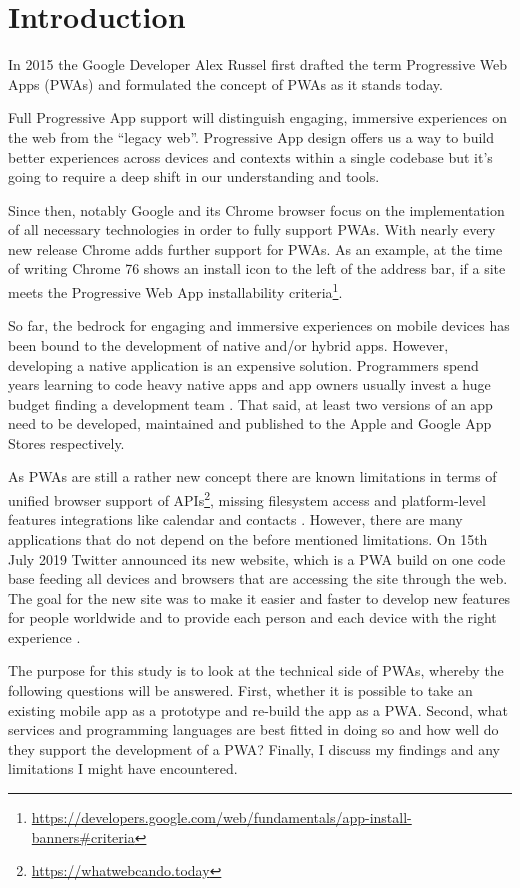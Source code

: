 \chapter{Introduction}

In 2015 the Google Developer Alex Russel first drafted the term Progressive Web Apps (PWAs) and formulated the concept of PWAs as it stands today.

Full Progressive App support will distinguish engaging, immersive experiences on the web from the “legacy web”. Progressive App design offers us a way to build better experiences across devices and contexts within a single codebase but it’s going to require a deep shift in our understanding and tools. \citep{russellProgressiveWebApps2015}

Since then, notably Google and its Chrome browser focus on the implementation of all necessary technologies in order to fully support PWAs. With nearly every new release Chrome adds further support for PWAs. As an example, at the time of writing Chrome 76 shows an install icon to the left of the address bar, if a site meets the Progressive Web App installability criteria\footnote{\url{https://developers.google.com/web/fundamentals/app-install-banners\#criteria}}.

So far, the bedrock for engaging and immersive experiences on mobile devices has been bound to the development of native and/or hybrid apps. However, developing a native application is an expensive solution. Programmers spend years learning to code heavy native apps and app owners usually invest a huge budget finding a development team \citep{nguyen2019progressive}. That said, at least two versions of an app need to be developed, maintained and published to the Apple and Google App Stores respectively.

As PWAs are still a rather new concept there are known limitations in terms of unified browser support of APIs\footnote{\url{https://whatwebcando.today}}, missing filesystem access and platform-level features integrations like calendar and contacts \citep{biorn-hansenProgressiveWebApps2018,malavoltaNativeAppsWeb2016}. However, there are many applications that do not depend on the before mentioned limitations. On 15th July 2019 Twitter announced its new website, which is a PWA build on one code base feeding all devices and browsers that are accessing the site through the web. The goal for the new site was to make it easier and faster to develop new features for people worldwide and to provide each person and each device with the right experience \citep{croomBuildingNewTwitter2019}.

The purpose for this study is to look at the technical side of PWAs, whereby the following questions will be answered. First, whether it is possible to take an existing mobile app as a prototype and re-build the app as a PWA. Second, what services and programming languages are best fitted in doing so and how well do they support the development of a PWA? Finally, I discuss my findings and any limitations I might have encountered.
